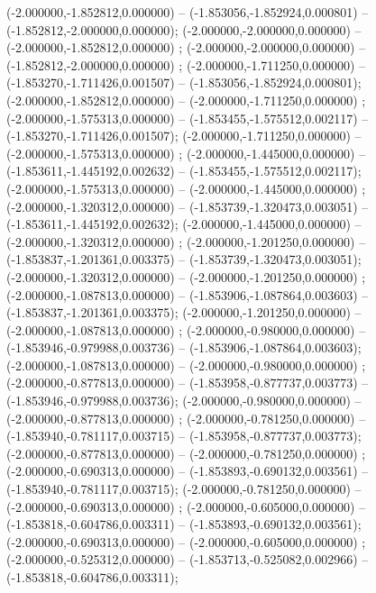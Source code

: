  (-2.000000,-1.852812,0.000000) -- (-1.853056,-1.852924,0.000801) -- (-1.852812,-2.000000,0.000000);
 (-2.000000,-2.000000,0.000000) -- (-2.000000,-1.852812,0.000000) ;
 (-2.000000,-2.000000,0.000000) -- (-1.852812,-2.000000,0.000000) ;
 (-2.000000,-1.711250,0.000000) -- (-1.853270,-1.711426,0.001507) -- (-1.853056,-1.852924,0.000801);
 (-2.000000,-1.852812,0.000000) -- (-2.000000,-1.711250,0.000000) ;
 (-2.000000,-1.575313,0.000000) -- (-1.853455,-1.575512,0.002117) -- (-1.853270,-1.711426,0.001507);
 (-2.000000,-1.711250,0.000000) -- (-2.000000,-1.575313,0.000000) ;
 (-2.000000,-1.445000,0.000000) -- (-1.853611,-1.445192,0.002632) -- (-1.853455,-1.575512,0.002117);
 (-2.000000,-1.575313,0.000000) -- (-2.000000,-1.445000,0.000000) ;
 (-2.000000,-1.320312,0.000000) -- (-1.853739,-1.320473,0.003051) -- (-1.853611,-1.445192,0.002632);
 (-2.000000,-1.445000,0.000000) -- (-2.000000,-1.320312,0.000000) ;
 (-2.000000,-1.201250,0.000000) -- (-1.853837,-1.201361,0.003375) -- (-1.853739,-1.320473,0.003051);
 (-2.000000,-1.320312,0.000000) -- (-2.000000,-1.201250,0.000000) ;
 (-2.000000,-1.087813,0.000000) -- (-1.853906,-1.087864,0.003603) -- (-1.853837,-1.201361,0.003375);
 (-2.000000,-1.201250,0.000000) -- (-2.000000,-1.087813,0.000000) ;
 (-2.000000,-0.980000,0.000000) -- (-1.853946,-0.979988,0.003736) -- (-1.853906,-1.087864,0.003603);
 (-2.000000,-1.087813,0.000000) -- (-2.000000,-0.980000,0.000000) ;
 (-2.000000,-0.877813,0.000000) -- (-1.853958,-0.877737,0.003773) -- (-1.853946,-0.979988,0.003736);
 (-2.000000,-0.980000,0.000000) -- (-2.000000,-0.877813,0.000000) ;
 (-2.000000,-0.781250,0.000000) -- (-1.853940,-0.781117,0.003715) -- (-1.853958,-0.877737,0.003773);
 (-2.000000,-0.877813,0.000000) -- (-2.000000,-0.781250,0.000000) ;
 (-2.000000,-0.690313,0.000000) -- (-1.853893,-0.690132,0.003561) -- (-1.853940,-0.781117,0.003715);
 (-2.000000,-0.781250,0.000000) -- (-2.000000,-0.690313,0.000000) ;
 (-2.000000,-0.605000,0.000000) -- (-1.853818,-0.604786,0.003311) -- (-1.853893,-0.690132,0.003561);
 (-2.000000,-0.690313,0.000000) -- (-2.000000,-0.605000,0.000000) ;
 (-2.000000,-0.525312,0.000000) -- (-1.853713,-0.525082,0.002966) -- (-1.853818,-0.604786,0.003311);
